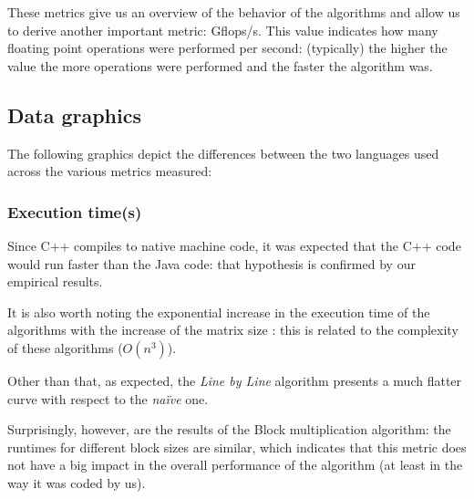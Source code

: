 \documentclass[11pt,a4paper]{article}
\begin{document}
These metrics give us an overview of the behavior of the algorithms and allow us to derive another important metric: Gflops/s. This value indicates how many floating point operations were performed per second: (typically) the higher the value the more operations were performed and the faster the algorithm was.

\subsection{Data graphics}

The following graphics depict the differences between the two languages used across the various metrics measured:

\subsubsection{Execution time(\unit{\second})}

Since C++ compiles to native machine code, it was expected that the C++ code would run faster than the Java code: that hypothesis is confirmed by our empirical results.

It is also worth noting  the exponential increase in the execution time of the algorithms with the increase of the matrix size : this is related to the complexity of these algorithms ($O(n^3)$).

Other than that, as expected, the \emph{Line by Line} algorithm presents a much flatter curve with respect to the \emph{naïve} one.

Surprisingly, however, are the results of the Block multiplication algorithm: the runtimes for different block sizes are similar, which indicates that this metric does not have a big impact in the overall performance of the algorithm (at least in the way it was coded by us).
\end{document}
